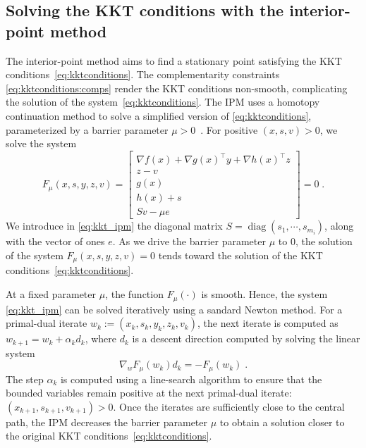 \documentclass[smallextended]{svjour3}
\DeclareMathOperator{\diag}{diag}
\begin{document}
\subsection{Solving the KKT conditions with the interior-point method}
\label{sec:ipm:kkt}
The interior-point method aims to find a stationary point
satisfying the KKT conditions~\eqref{eq:kktconditions}.
The complementarity constraints \eqref{eq:kktconditions:comps}
render the KKT conditions non-smooth, complicating the solution of
the system~\eqref{eq:kktconditions}.
The IPM uses a homotopy continuation method to solve a simplified
version of \eqref{eq:kktconditions}, parameterized by a barrier
parameter $\mu > 0$~\cite[Chapter 19]{nocedal_numerical_2006}.
For positive $(x, s, v) > 0$, we solve the system
\begin{equation}
  \label{eq:kkt_ipm}
  F_\mu(x, s, y, z, v) =
  \begin{bmatrix}
       \nabla f(x) + \nabla g(x)^\top y + \nabla h(x)^\top z   \\
       z - v  \\
       g(x)  \\
       h(x) + s  \\
       S v - \mu e
  \end{bmatrix} = 0
   \; .
\end{equation}
We introduce in \eqref{eq:kkt_ipm} the diagonal matrix
$S = \diag(s_1, \cdots, s_{m_i})$, along with the vector of ones $e$.
As we drive the barrier parameter $\mu$ to $0$, the solution of the
system $F_\mu(x, s, y, z, v) = 0$ tends toward the solution of the
KKT conditions~\eqref{eq:kktconditions}.

At a fixed parameter $\mu$, the function $F_\mu(\cdot)$ is smooth. Hence, the system \eqref{eq:kkt_ipm} can be solved iteratively
using a sandard Newton method. For a primal-dual iterate
$w_k := (x_k, s_k, y_k, z_k, v_k)$, the next iterate is computed as
$w_{k+1} = w_k + \alpha_k d_k$, where $d_k$ is a descent
direction computed by solving the linear system
\begin{equation}
  \label{eq:newton_step}
  \nabla_w F_{\mu}(w_k) d_k = -F_{\mu}(w_k) \; .
\end{equation}
The step $\alpha_k$ is computed using a line-search algorithm
to ensure that the bounded variables remain positive
at the next primal-dual iterate: $(x_{k+1}, s_{k+1}, v_{k+1}) > 0$.
Once the iterates are sufficiently close to the central path,
the IPM decreases the barrier parameter $\mu$ to obtain a solution closer to
the original KKT conditions~\eqref{eq:kktconditions}.
\end{document}

